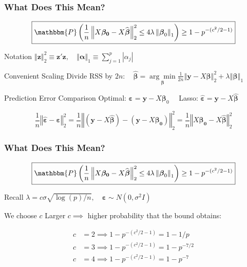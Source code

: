 \begin{frame}
  \frametitle{What Does This Mean?}
    \[
      \boxed{\mathbbm{P}\left(\frac{1}{n}\left\Vert X\boldsymbol{\beta_0} - X\widehat{\boldsymbol{\beta}} \right\Vert_2^2 \leq 4 \lambda \left \Vert \boldsymbol{\beta}_0 \right\Vert_1\right) \geq 1 - p^{-(c^2/2 - 1)}}
    \]

  \begin{block}{Notation}
    $\left\Vert \mathbf{z} \right\Vert_2^2 \equiv \mathbf{z}'\mathbf{z}, \quad \left\Vert \boldsymbol{\alpha} \right\Vert_1 \equiv \sum_{j=1}^p \left| \alpha_j \right|$
  \end{block}

  \begin{block}{Convenient Scaling} 
    Divide RSS by $2n\colon \quad \widehat{\boldsymbol{\beta}} = \underset{\boldsymbol{\beta}}{\arg \min} \displaystyle\frac{1}{2n} \left\Vert \mathbf{y} - X\boldsymbol{\beta}\right\Vert_2^2 +  \lambda \left\Vert \boldsymbol{\beta}\right\Vert_1$
  \end{block}
  
  \begin{block}{Prediction Error Comparison} 
    Optimal: $\boldsymbol{\varepsilon} = \mathbf{y} - X\boldsymbol{\beta}_0\quad$ Lasso: $\widehat{\boldsymbol{\varepsilon}} = \boldsymbol{y} - X\boldsymbol{\widehat{\boldsymbol{\beta}}}$

    \[
      \frac{1}{n}\left\Vert \widehat{\boldsymbol{\varepsilon}} - \boldsymbol{\varepsilon} \right\Vert_2^2  = 
      \frac{1}{n}\left\Vert (\mathbf{y} - X\widehat{\boldsymbol{\beta}}) - (\mathbf{y} - X\boldsymbol{\beta_0}) \right\Vert_2^2  = \frac{1}{n}\left\Vert X\boldsymbol{\beta_0} - X\widehat{\boldsymbol{\beta}} \right\Vert_2^2
    \]
  \end{block}
\end{frame}
\begin{frame}
  \frametitle{What Does This Mean?}
    \[
      \boxed{\mathbbm{P}\left(\frac{1}{n}\left\Vert X\boldsymbol{\beta_0} - X\widehat{\boldsymbol{\beta}} \right\Vert_2^2 \leq 4 \lambda \left \Vert \boldsymbol{\beta}_0 \right\Vert_1\right) \geq 1 - p^{-(c^2/2 - 1)}}
    \]

    \begin{block}{Recall}
      $\lambda = c \sigma \sqrt{\log(p)/n}, \quad \boldsymbol{\varepsilon} \sim N(0, \sigma^2 I)$
    \end{block}

    \begin{block}{We choose $c$}
      Larger $c \implies$ higher probability that the bound obtains:

      \begin{align*}
        c &= 2 \implies 1 - p^{-(c^2/2 - 1)} = 1 - 1/p\\
        c &= 3 \implies 1 - p^{-(c^2/2 - 1)} = 1 - p^{-7/2}\\
        c &= 4 \implies 1 - p^{-(c^2/2 - 1)} = 1 - p^{-7}
      \end{align*}
    \end{block}

\end{frame}
